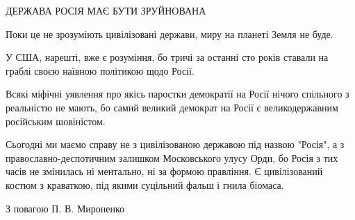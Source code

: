  
 
 
 
 

ДЕРЖАВА РОСІЯ МАЄ БУТИ ЗРУЙНОВАНА

Поки це не зрозуміють цивілізовані держави, миру на планеті Земля не буде.

У США, нарешті, вже є розуміння, бо тричі за останні сто років ставали на граблі своєю наївною політикою щодо Росії.

Всякі міфічні уявлення про якісь паростки демократії на Росії нічого спільного з реальністю не мають, бо самий великий демократ на Росії є великодержавним російським шовіністом.

Сьогодні ми маємо справу не з цивілізованою державою під назвою "Росія", а з
православно-деспотичним залишком Московського улусу Орди, бо Росія з тих часів
не змінилась ні ментально, ні за формою правління. Є цивілізований костюм з
краваткою, під якими суцільний фальш і гнила біомаса.

З повагою П. В. Мироненко
